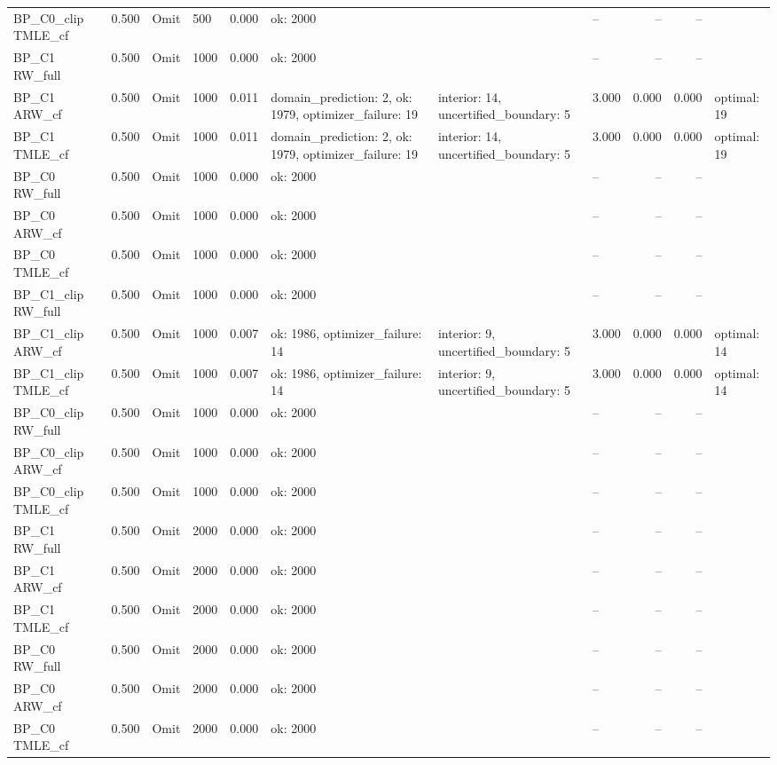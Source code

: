 \begin{tabular}{llllrlllrrl}
BP\_C0\_clip TMLE\_cf & 0.500 & Omit & 500 & 0.000 & ok: 2000 &  & -- & -- & -- &  \\
BP\_C1 RW\_full & 0.500 & Omit & 1000 & 0.000 & ok: 2000 &  & -- & -- & -- &  \\
BP\_C1 ARW\_cf & 0.500 & Omit & 1000 & 0.011 & domain\_prediction: 2, ok: 1979, optimizer\_failure: 19 & interior: 14, uncertified\_boundary: 5 & 3.000 & 0.000 & 0.000 & optimal: 19 \\
BP\_C1 TMLE\_cf & 0.500 & Omit & 1000 & 0.011 & domain\_prediction: 2, ok: 1979, optimizer\_failure: 19 & interior: 14, uncertified\_boundary: 5 & 3.000 & 0.000 & 0.000 & optimal: 19 \\
BP\_C0 RW\_full & 0.500 & Omit & 1000 & 0.000 & ok: 2000 &  & -- & -- & -- &  \\
BP\_C0 ARW\_cf & 0.500 & Omit & 1000 & 0.000 & ok: 2000 &  & -- & -- & -- &  \\
BP\_C0 TMLE\_cf & 0.500 & Omit & 1000 & 0.000 & ok: 2000 &  & -- & -- & -- &  \\
BP\_C1\_clip RW\_full & 0.500 & Omit & 1000 & 0.000 & ok: 2000 &  & -- & -- & -- &  \\
BP\_C1\_clip ARW\_cf & 0.500 & Omit & 1000 & 0.007 & ok: 1986, optimizer\_failure: 14 & interior: 9, uncertified\_boundary: 5 & 3.000 & 0.000 & 0.000 & optimal: 14 \\
BP\_C1\_clip TMLE\_cf & 0.500 & Omit & 1000 & 0.007 & ok: 1986, optimizer\_failure: 14 & interior: 9, uncertified\_boundary: 5 & 3.000 & 0.000 & 0.000 & optimal: 14 \\
BP\_C0\_clip RW\_full & 0.500 & Omit & 1000 & 0.000 & ok: 2000 &  & -- & -- & -- &  \\
BP\_C0\_clip ARW\_cf & 0.500 & Omit & 1000 & 0.000 & ok: 2000 &  & -- & -- & -- &  \\
BP\_C0\_clip TMLE\_cf & 0.500 & Omit & 1000 & 0.000 & ok: 2000 &  & -- & -- & -- &  \\
BP\_C1 RW\_full & 0.500 & Omit & 2000 & 0.000 & ok: 2000 &  & -- & -- & -- &  \\
BP\_C1 ARW\_cf & 0.500 & Omit & 2000 & 0.000 & ok: 2000 &  & -- & -- & -- &  \\
BP\_C1 TMLE\_cf & 0.500 & Omit & 2000 & 0.000 & ok: 2000 &  & -- & -- & -- &  \\
BP\_C0 RW\_full & 0.500 & Omit & 2000 & 0.000 & ok: 2000 &  & -- & -- & -- &  \\
BP\_C0 ARW\_cf & 0.500 & Omit & 2000 & 0.000 & ok: 2000 &  & -- & -- & -- &  \\
BP\_C0 TMLE\_cf & 0.500 & Omit & 2000 & 0.000 & ok: 2000 &  & -- & -- & -- &  \\

\end{tabular}
